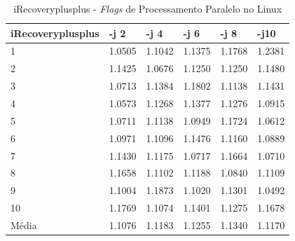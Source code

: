 \begin{apendicesenv}
\begin{table}[!ht]
\centering
\tiny
\caption{iRecoveryplusplus - \textit{Flags} de Processamento Paralelo no Linux}
\label{tab:flag_processamento_paralelo:linux:irecoveryplusplus}
\begin{tabular}{llllll}
\textbf{iRecoveryplusplus} & \textbf{-j 2} & \textbf{-j 4} & \textbf{-j 6} & \textbf{-j 8} & \textbf{-j10}  \\ \toprule
1                          & 1.0505        &  1.1042       &  1.1375       &  1.1768       &  1.2381        \\ 
2                          & 1.1425        &  1.0676       &  1.1250       &  1.1250       &  1.1480        \\ 
3                          & 1.0713        &  1.1384       &  1.1802       &  1.1138       &  1.1431        \\ 
4                          & 1.0573        &  1.1268       &  1.1377       &  1.1276       &  1.0915        \\ 
5                          & 1.0711        &  1.1138       &  1.0949       &  1.1724       &  1.0612        \\ 
6                          & 1.0971        &  1.1096       &  1.1476       &  1.1160       &  1.0889        \\ 
7                          & 1.1430        &  1.1175       &  1.0717       &  1.1664       &  1.0710        \\ 
8                          & 1.1658        &  1.1102       &  1.1188       &  1.0840       &  1.1109        \\ 
9                          & 1.1004        &  1.1873       &  1.1020       &  1.1301       &  1.0492        \\ 
10                         & 1.1769        &  1.1074       &  1.1401       &  1.1275       &  1.1678        \\ \bottomrule
Média                      & 1.1076        &  1.1183       &  1.1255       &  1.1340       &  1.1170        \\ 
\end{tabular}
\end{table}


\end{apendicesenv}

